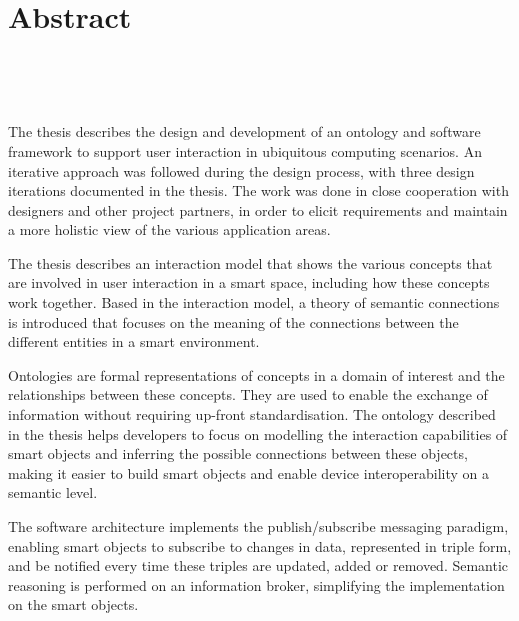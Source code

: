 \cleardoublepage
{}
\pagestyle{empty}

\begingroup


\chapter*{Abstract}

\begingroup
    \spacedallcaps{\myTitle} \\ 
\endgroup

\begingroup
\noindent
\spacedlowsmallcaps{\mySubtitle}\\ \bigskip
\endgroup

The thesis describes the design and development of an ontology and software framework to support user interaction in ubiquitous computing scenarios. An iterative approach was followed during the design process, with three design iterations documented in the thesis. The work was done in close cooperation with designers and other project partners, in order to elicit requirements and maintain a more holistic view of the various application areas.
 
The thesis describes an interaction model that shows the various concepts that are involved in user interaction in a smart space, including how these concepts work together. Based in the interaction model, a theory of semantic connections is introduced that focuses on the meaning of the connections between the different entities in a smart environment.

Ontologies are formal representations of concepts in a domain of interest and the relationships between these concepts. They are used to enable the exchange of information without requiring up-front standardisation. The ontology described in the thesis helps developers to focus on modelling the interaction capabilities of smart objects and inferring the possible connections between these objects, making it easier to build smart objects and enable device interoperability on a semantic level.

The software architecture implements the publish/subscribe messaging paradigm, enabling smart objects to subscribe to changes in data, represented in triple form, and be notified every time these triples are updated, added or removed. Semantic reasoning is performed on an information broker, simplifying the implementation on the smart objects.


